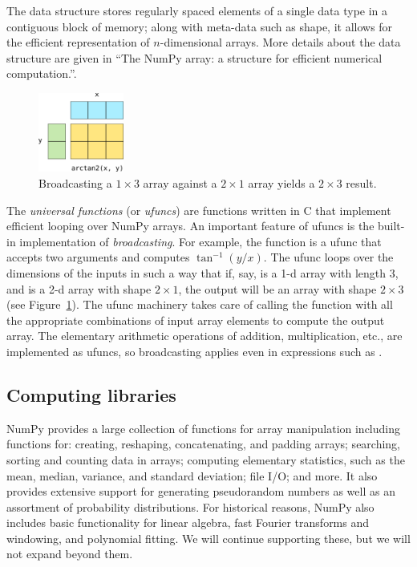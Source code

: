 The  data structure stores regularly spaced elements of a single
data type in a contiguous block of memory; along with meta-data such as shape,
it allows for the efficient representation of $n$-dimensional arrays.
More details about the data structure are given in ``The NumPy array:
a structure for efficient numerical computation.''\cite{vanderwalt2011numpy}.

\begin{figure}
  \centering
  \includegraphics[width=0.25\textwidth]{static/broadcasting}
  \caption{
    Broadcasting a $1 \times 3$ array against a $2 \times 1$ array
    yields a $2 \times 3$ result.
  }
  \label{fig:broadcasting}
\end{figure}

The \emph{universal functions} (or \emph{ufuncs})
are functions written in C that implement efficient looping over
NumPy arrays. An important feature of ufuncs is the built-in
implementation of \emph{broadcasting}.  For example, the function
 is a ufunc that accepts two arguments and computes
$\tan^{-1}(y/x)$.  The ufunc loops over the dimensions of the inputs
in such a way that if, say,  is a 1-d array with length 3, and
 is a 2-d array with shape $2 \times 1$, the output will be
an array with shape $2 \times 3$ (see Figure~\ref{fig:broadcasting}).  The ufunc machinery takes care
of calling the function with all the appropriate combinations of
input array elements to compute the output array.
The elementary arithmetic operations of addition, multiplication, etc.,
are implemented as ufuncs, so broadcasting applies even in expressions
such as .

\subsection{Computing libraries}

NumPy provides a large collection of functions for array manipulation
including functions for: creating, reshaping, concatenating, and padding arrays;
searching, sorting and counting data
in arrays; computing elementary statistics, such as the mean, median,
variance, and standard deviation; file I/O; and more.
It also provides extensive support for generating pseudorandom numbers
as well as an assortment of probability distributions.
For historical reasons, NumPy also includes basic functionality for
linear algebra, fast Fourier transforms and windowing,
and polynomial fitting.
We will continue supporting these, but we will not expand beyond them.

